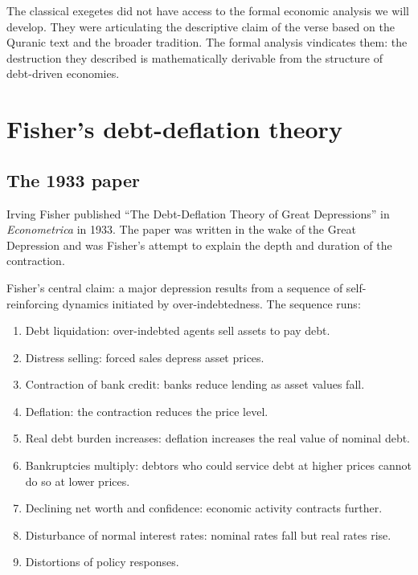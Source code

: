 The classical exegetes did not have access to the formal economic
analysis we will develop. They were articulating the descriptive
claim of the verse based on the Quranic text and the broader
tradition. The formal analysis vindicates them: the destruction
they described is mathematically derivable from the structure of
debt-driven economies.

\section{Fisher's debt-deflation theory}
\label{sec:riba-fisher}

\subsection{The 1933 paper}

Irving Fisher published ``The Debt-Deflation Theory of Great
Depressions'' in \emph{Econometrica} in 1933. The paper was
written in the wake of the Great Depression and was Fisher's
attempt to explain the depth and duration of the contraction.

Fisher's central claim: a major depression results from a sequence
of self-reinforcing dynamics initiated by over-indebtedness. The
sequence runs:

\begin{enumerate}[leftmargin=2em]
    \item Debt liquidation: over-indebted agents sell assets to
    pay debt.
    \item Distress selling: forced sales depress asset prices.
    \item Contraction of bank credit: banks reduce lending as
    asset values fall.
    \item Deflation: the contraction reduces the price level.
    \item Real debt burden increases: deflation increases the real
    value of nominal debt.
    \item Bankruptcies multiply: debtors who could service debt at
    higher prices cannot do so at lower prices.
    \item Declining net worth and confidence: economic activity
    contracts further.
    \item Disturbance of normal interest rates: nominal rates fall
    but real rates rise.
    \item Distortions of policy responses.
\end{enumerate}

